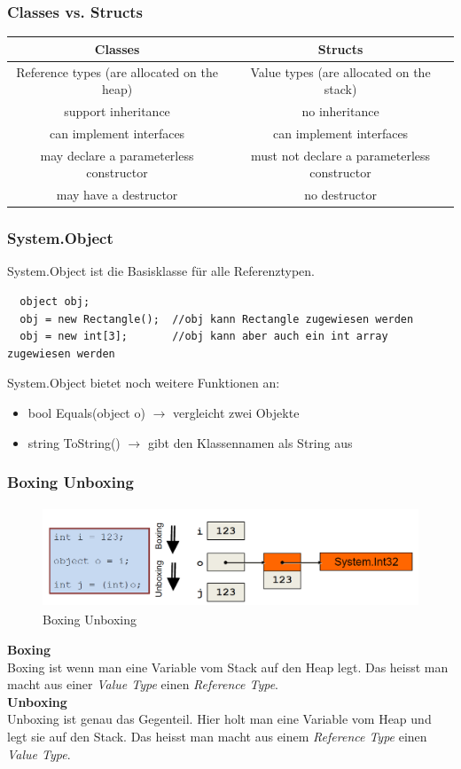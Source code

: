 \subsubsection{Classes vs. Structs}
\begin{tabular}{|c|c|}
	\hline
    \textbf{Classes }&
    \textbf{Structs}\\
  \hline
	  Reference types (are allocated on the heap) &
	  Value types (are allocated on the stack)\\
  \hline
	  support inheritance &
	  no inheritance \\
	\hline
    can implement interfaces &
    can implement interfaces \\
  \hline
	  may declare a parameterless constructor & 
	  must not declare a parameterless constructor \\ 
	\hline
    may have a destructor &
    no destructor \\
  \hline
\end{tabular}

\subsubsection{System.Object}
System.Object ist die Basisklasse für alle Referenztypen.
\begin{lstlisting}
  object obj;
  obj = new Rectangle();  //obj kann Rectangle zugewiesen werden
  obj = new int[3];       //obj kann aber auch ein int array zugewiesen werden
\end{lstlisting}
  System.Object bietet noch weitere Funktionen an:
  \begin{itemize}
    \item  bool Equals(object o) $\rightarrow$ vergleicht zwei Objekte
    \item  string ToString() $\rightarrow$ gibt den Klassennamen als String aus
  \end{itemize}

\subsubsection{Boxing Unboxing}
\begin{figure}[h]
	\centering
	\includegraphics[height=3cm, ]{images/CSharp/BoxingUnboxing}
	\caption{Boxing Unboxing}	
\end{figure}

\textbf{Boxing}\\
Boxing ist wenn man eine Variable vom Stack auf den Heap legt. Das heisst man macht aus einer \textit{Value Type} einen \textit{Reference Type}.\\ 

\textbf{Unboxing}\\
Unboxing ist genau das Gegenteil. Hier holt man eine Variable vom Heap und legt sie auf den Stack. Das heisst man macht aus einem \textit{Reference Type} einen \textit{Value Type}.
